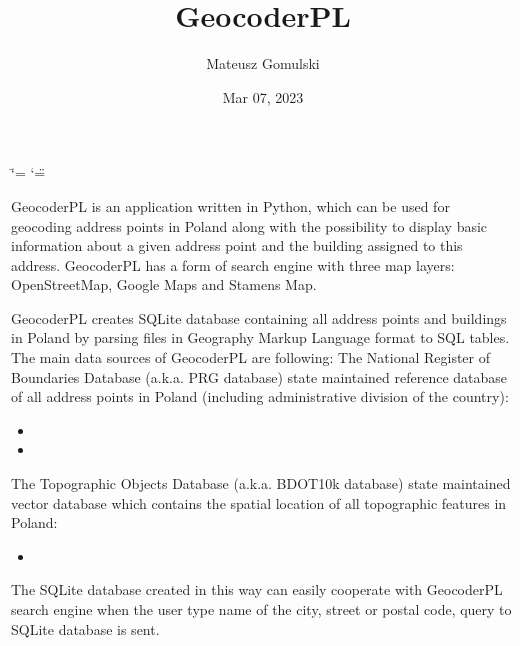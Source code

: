 \documentclass[letterpaper,10pt,english]{sphinxmanual}
\title{GeocoderPL}
\date{Mar 07, 2023}
\author{Mateusz Gomulski}
\begin{document}
\ifdefined\shorthandoff
  \ifnum\catcode`\=\string=\active\shorthandoff{=}\fi
  \ifnum\catcode`\"=\active{}\fi
\fi

\pagestyle{empty}
\sphinxmaketitle
\pagestyle{plain}
\sphinxtableofcontents
\pagestyle{normal}
\label{\detokenize{index::doc}}


\sphinxAtStartPar
GeocoderPL is an application written in Python, which can be used for geocoding address points in Poland along with the possibility to display basic information about a given address point and the building assigned to this address. GeocoderPL has a form of search engine with three map layers: OpenStreetMap, Google Maps and Stamens Map.

\sphinxAtStartPar
GeocoderPL creates SQLite database containing all address points and buildings in Poland by parsing files in Geography Markup Language format to SQL tables. The main data sources of GeocoderPL are following:
The National Register of Boundaries Database (a.k.a. PRG database)\sphinxhyphen{} state maintained reference database of all address points in Poland (including administrative division of the country):
\begin{itemize}
\item {} 
\sphinxAtStartPar
{}

\item {} 
\sphinxAtStartPar
{}

\end{itemize}

\sphinxAtStartPar
The Topographic Objects Database (a.k.a. BDOT10k database) \sphinxhyphen{} state maintained vector database which contains the spatial location of all topographic features in Poland:
\begin{itemize}
\item {} 
\sphinxAtStartPar
{}

\end{itemize}

\sphinxAtStartPar
The SQLite database created in this way can easily cooperate with GeocoderPL search engine \sphinxhyphen{} when the user type name of the city, street or postal code, query to SQLite database is sent.
\end{document}
